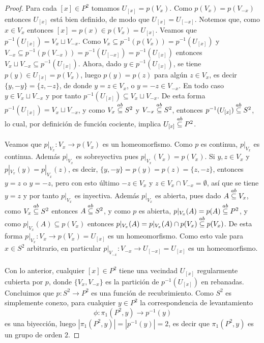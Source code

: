 \begin{proof}
Para cada $[x]\in P^2$ tomamos $U_{[x]}=p(V_x)$. Como $p(V_x)=p(V_{-x})$ entonces $U_{[x]}$ está bien definido, de modo que $U_{[x]}=U_{[-x]}$. Notemos que, como $x\in V_x$ entonces $[x]=p(x)\in p(V_x)=U_{[x]}$. Veamos que $p^{-1}(U_{[x]})=V_x\sqcup V_{-x}$. Como $V_x\subseteq p^{-1}(p(V_x))=p^{-1}(U_{[x]})$ y $V_{-x}\subseteq p^{-1}(p(V_{-x}))=p^{-1}(U_{[-x]})=p^{-1}(U_{[x]})$ entonces $V_x\sqcup V_{-x}\subseteq p^{-1}(U_{[x]})$. Ahora, dado $y\in p^{-1}(U_{[x]})$, se tiene $p(y)\in U_{[x]}=p(V_x)$, luego $p(y)=p(z)$ para algún $z\in V_x$, es decir $\{y,-y\}=\{z,-z\}$, de donde $y=z\in V_x$, o $y=-z\in V_{-x}$. En todo caso $y\in V_x\sqcup V_{-x}$ y por tanto $p^{-1}(U_{[x]})\subseteq V_x\sqcup V_{-x}$. De esta forma $p^{-1}(U_{[x]})=V_x\sqcup V_{-x}$, y como $V_x\stackrel{ab}{\subseteq} S^2$ y $V_{-x}\stackrel{ab}{\subseteq} S^2$, entonces $p^{-1}(U_{[x]})\stackrel{ab}{\subseteq} S^2$, lo cual, por definición de función cociente, implica $U_{[x]}\stackrel{ab}{\subseteq} P^2$.\\\\
Veamos que $p|_{V_x}:V_x\to p(V_x)$ es un homeomorfismo. Como $p$ es continua, $p|_{V_x}$ es continua. Además $p|_{V_x}$ es sobreyectiva pues $p|_{V_x}(V_x)=p(V_x)$. Si $y,z\in V_x$ y $p|_{V_x}(y)=p|_{V_x}(z)$, es decir, $\{y,-y\}=p(y)=p(z)=\{z,-z\}$, entonces $y=z$ o $y=-z$, pero con esto último $-z\in V_x$ y $z\in V_x\cap V_{-x}=\emptyset$, así que se tiene $y=z$ y por tanto $p|_{V_x}$ es inyectiva. Además $p|_{V_x}$ es abierta, pues dado $A\stackrel{ab}{\subseteq} V_x$, como $V_x\stackrel{ab}{\subseteq} S^2$ entonces $A\stackrel{ab}{\subseteq} S^2$, y como $p$ es abierta, $p|_{V_x}(A)=p(A)\stackrel{ab}{\subseteq} P^2$, y como $p|_{V_x}(A)\subseteq p(V_x)$ entonces $p|_{V_x}(A)=p|_{V_x}(A)\cap p(V_x)\stackrel{ab}{\subseteq} p(V_x)$. De esta forma $p|_{V_x}:V_x\to p(V_x)=U_{[x]}$ es un homeomorfismo. Como esto vale para $x\in S^2$ arbitrario, en particular $p|_{V_{-x}}:V_{-x}\to U_{[-x]}=U_{[x]}$ es un homeomorfismo.\\\\
Con lo anterior, cualquier $[x]\in P^2$ tiene una vecindad $U_{[x]}$ regularmente cubierta por $p$, donde $\{V_x,V_{-x}\}$ es la partición de $p^{-1}(U_{[x]})$ en rebanadas. Concluimos que $p:S^2\to P^2$ es una función de recubrimiento. Como $S^2$ es simplemente conexo, para cualquier $y\in P^2$ la correspondencia de levantamiento
\[
\phi:\pi_1(P^2,y)\to p^{-1}(y)
\]
es una biyección, luego $|\pi_1(P^2,y)|=|p^{-1}(y)|=2$, es decir que $\pi_1(P^2,y)$ es un grupo de orden $2$.
\end{proof}
